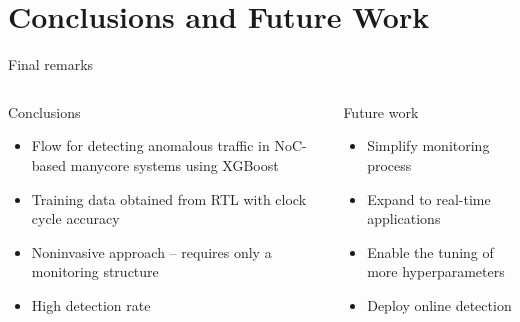 \section{Conclusions and Future Work}

\begin{frame}{Final remarks}
    \begin{columns}
        \begin{block}{Conclusions}
            \begin{itemize}
                \item Flow for detecting anomalous traffic in NoC-based manycore systems using XGBoost
                \item Training data obtained from RTL with clock cycle accuracy
                \item Noninvasive approach -- requires only a monitoring structure
                \item High detection rate
            \end{itemize}
        \end{block}

        \begin{block}{Future work}
            \begin{itemize}
                \item Simplify monitoring process
                \item Expand to real-time applications
                \item Enable the tuning of more hyperparameters
                \item Deploy online detection
            \end{itemize}
        \end{block}
    \end{columns}
\end{frame}